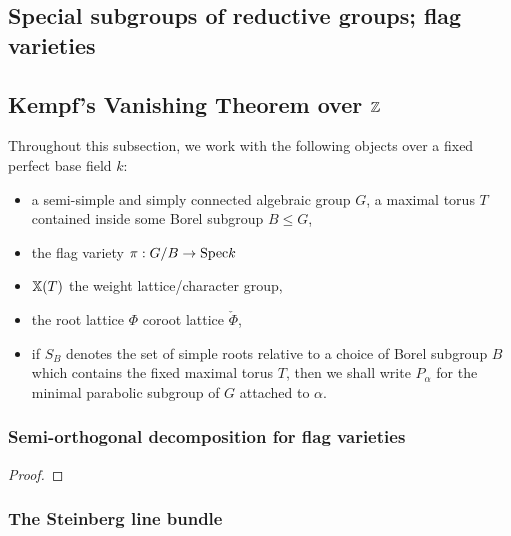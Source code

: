         \subsection{Special subgroups of reductive groups; flag varieties}
            
        \subsection{Kempf's Vanishing Theorem over \texorpdfstring{$\mathbb{Z}$}{}}
            \begin{convention}
                Throughout this subsection, we work with the following objects over a fixed perfect base field $k$:
                    \begin{itemize}
                        \item a semi-simple and simply connected algebraic group $G$, a maximal torus $T$ contained inside some Borel subgroup $B \leq G$,
                        \item the flag variety $\pi: G/B \to \mathrm{Spec} k$
                        \item $\mathbb{X}(T)$ the weight lattice/character group,
                        \item the root lattice $\Phi$ coroot lattice $\check{\Phi}$,
                        \item if $S_B$ denotes the set of simple roots relative to a choice of Borel subgroup $B$ which contains the fixed maximal torus $T$, then we shall write $P_{\alpha}$ for the minimal parabolic subgroup of $G$ attached to $\alpha$.
                    \end{itemize}
            \end{convention}
        
            \subsubsection{Semi-orthogonal decomposition for flag varieties}
                \begin{proposition}
                    
                \end{proposition}
                    \begin{proof}
                        
                    \end{proof}
            
            \subsubsection{The Steinberg line bundle}
        
